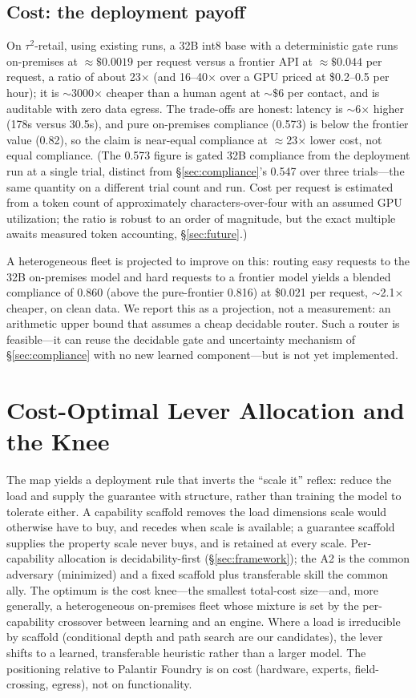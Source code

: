 \documentclass[10pt]{article}
\begin{document}
\subsection{Cost: the deployment payoff}\label{sec:cost}
On $\tau^2$-retail, using existing runs, a 32B int8 base with a deterministic gate runs on-premises at $\approx\$0.0019$ per request versus a frontier API at $\approx\$0.044$ per request, a ratio of about 23$\times$ (and 16--40$\times$ over a GPU priced at \$0.2--0.5 per hour); it is $\sim$3000$\times$ cheaper than a human agent at $\sim\$6$ per contact, and is auditable with zero data egress. The trade-offs are honest: latency is $\sim$6$\times$ higher (178s versus 30.5s), and pure on-premises compliance (0.573) is below the frontier value (0.82), so the claim is near-equal compliance at $\approx$23$\times$ lower cost, not equal compliance. (The 0.573 figure is gated 32B compliance from the deployment run at a single trial, distinct from \S\ref{sec:compliance}'s 0.547 over three trials---the same quantity on a different trial count and run. Cost per request is estimated from a token count of approximately characters-over-four with an assumed GPU utilization; the ratio is robust to an order of magnitude, but the exact multiple awaits measured token accounting, \S\ref{sec:future}.)

A heterogeneous fleet is projected to improve on this: routing easy requests to the 32B on-premises model and hard requests to a frontier model yields a blended compliance of 0.860 (above the pure-frontier 0.816) at \$0.021 per request, $\sim$2.1$\times$ cheaper, on clean data. We report this as a projection, not a measurement: an arithmetic upper bound that assumes a cheap decidable router. Such a router is feasible---it can reuse the decidable gate and uncertainty mechanism of \S\ref{sec:compliance} with no new learned component---but is not yet implemented.

\section{Cost-Optimal Lever Allocation and the Knee}\label{sec:knee}
The map yields a deployment rule that inverts the ``scale it'' reflex: reduce the load and supply the guarantee with structure, rather than training the model to tolerate either. A capability scaffold removes the load dimensions scale would otherwise have to buy, and recedes when scale is available; a guarantee scaffold supplies the property scale never buys, and is retained at every scale. Per-capability allocation is decidability-first (\S\ref{sec:framework}); the A2 is the common adversary (minimized) and a fixed scaffold plus transferable skill the common ally. The optimum is the cost knee---the smallest total-cost size---and, more generally, a heterogeneous on-premises fleet whose mixture is set by the per-capability crossover between learning and an engine. Where a load is irreducible by scaffold (conditional depth and path search are our candidates), the lever shifts to a learned, transferable heuristic rather than a larger model. The positioning relative to Palantir Foundry is on cost (hardware, experts, field-crossing, egress), not on functionality.
\end{document}

